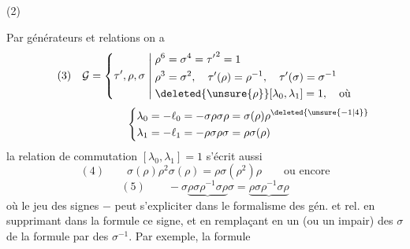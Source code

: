 \begin{samepage}
(2)\quad
{}
\end{samepage}

Par générateurs et relations on a
\[
(3)\quad\mathcal{G}=\left\{\tau',\rho,\sigma\;\middle|\;
\begin{aligned}
&\rho^6=\sigma^4={\tau'}^2=1\\
&\rho^3=\sigma^2,\quad\tau'(\rho)=\rho^{-1},\quad\tau'(\sigma)=\sigma^{-1}\\
&\deleted{\unsure{\rho}}[\lambda_0,\lambda_1]=1,\quad\text{où}
\end{aligned}\right.
\]
\[
\hspace{8em}\left\{
\begin{aligned}
\lambda_0&=-\ell_0=-\sigma\rho\sigma\rho=\sigma(\rho)\rho^{\deleted{\unsure{-1|4}}}\\
\lambda_1&=-\ell_1=-\rho\sigma\rho\sigma=\rho\sigma(\rho)
\end{aligned}\right.
\]
 la relation de commutation $[\lambda_0,\lambda_1]=1$ s'écrit aussi
\[
(4)\qquad \sigma(\rho)\rho^2\sigma(\rho)=\rho\sigma(\rho^2)\rho
\qquad\text{ou encore}
\]
\[
(5)\qquad -\sigma\underbrace{\rho\sigma\rho^{-1}\sigma\rho}\sigma
=\underbrace{\rho\sigma\rho^{-1}\sigma\rho}
\]
où le jeu des signes $-$ peut s'expliciter dans le formalisme des gén. et rel. en supprimant dans la formule ce signe, et en remplaçant en  un (ou un  impair) des $\sigma$ de la formule par des $\sigma^{-1}$. Par exemple, la formule

